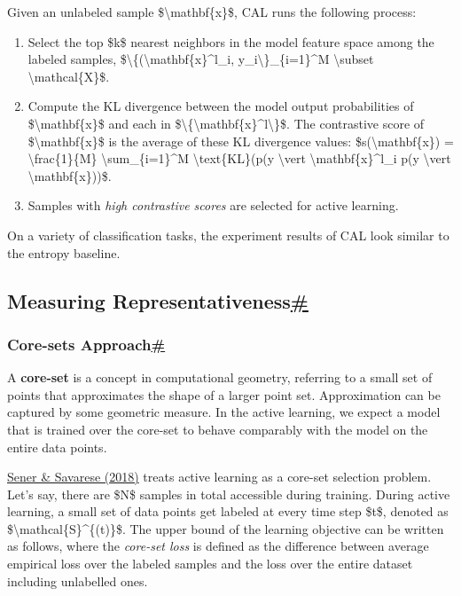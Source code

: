 Given an unlabeled sample \$\textbackslash mathbf\{x\}\$, CAL runs the following process:

\begin{enumerate}
\tightlist
\item
  Select the top \$k\$ nearest neighbors in the model feature space among the labeled samples, \$\textbackslash\{(\textbackslash mathbf\{x\}\^{}l\_i, y\_i\textbackslash\}\_\{i=1\}\^{}M \textbackslash subset \textbackslash mathcal\{X\}\$.
\item
  Compute the KL divergence between the model output probabilities of \$\textbackslash mathbf\{x\}\$ and each in \$\textbackslash\{\textbackslash mathbf\{x\}\^{}l\textbackslash\}\$. The contrastive score of \$\textbackslash mathbf\{x\}\$ is the average of these KL divergence values: \$s(\textbackslash mathbf\{x\}) = \textbackslash frac\{1\}\{M\} \textbackslash sum\_\{i=1\}\^{}M \textbackslash text\{KL\}(p(y \textbackslash vert \textbackslash mathbf\{x\}\^{}l\_i \textbar{} p(y \textbackslash vert \textbackslash mathbf\{x\}))\$.
\item
  Samples with \emph{high contrastive scores} are selected for active learning.
\end{enumerate}

On a variety of classification tasks, the experiment results of CAL look similar to the entropy baseline.

\subsection{\texorpdfstring{Measuring Representativeness\hyperref[measuring-representativeness]{\#}}{Measuring Representativeness\#}}\label{measuring-representativeness}

\subsubsection{\texorpdfstring{Core-sets Approach\hyperref[core-sets-approach]{\#}}{Core-sets Approach\#}}\label{core-sets-approach}

A \textbf{core-set} is a concept in computational geometry, referring to a small set of points that approximates the shape of a larger point set. Approximation can be captured by some geometric measure. In the active learning, we expect a model that is trained over the core-set to behave comparably with the model on the entire data points.

\href{https://arxiv.org/abs/1708.00489}{Sener \& Savarese (2018)} treats active learning as a core-set selection problem. Let's say, there are \$N\$ samples in total accessible during training. During active learning, a small set of data points get labeled at every time step \$t\$, denoted as \$\textbackslash mathcal\{S\}\^{}\{(t)\}\$. The upper bound of the learning objective can be written as follows, where the \emph{core-set loss} is defined as the difference between average empirical loss over the labeled samples and the loss over the entire dataset including unlabelled ones.

